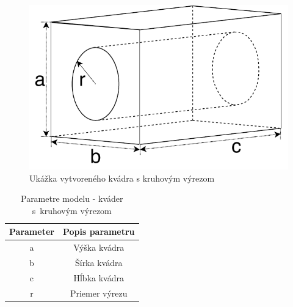 \begin{minipage}[b]{\textwidth}
\begin{minipage}[b]{0.49\textwidth}
\begin{figure}[H]
	\centering
	\includegraphics[height=0.49\textwidth]{obrazky-figures/Examples/A4.pdf}
	\caption{Ukážka vytvoreného kvádra s kruhovým výrezom}
	\label{fig:A4First}
\end{figure}
\end{minipage}
\begin{minipage}[b]{0.49\textwidth}
\begin{table}[H]
\centering
\begin{tabular}{ |c|c| }
 \hline
 Parameter & Popis parametru \\
 \hline
 \hline
 a & Výška kvádra\\ 
  \hline
 b & Šírka kvádra \\  
  \hline
 c & Hĺbka kvádra \\  
  \hline
 r & Priemer výrezu  \\
  \hline
\end{tabular}
\caption{Parametre modelu - kváder s~kruhovým výrezom}
 \label{tab:blockWithCircleHole}
\end{table}

\end{minipage}
\end{minipage}

